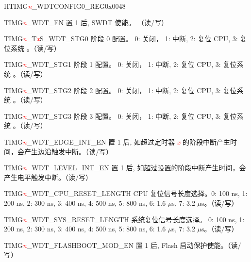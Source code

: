 \begin{register}{H}{TIMG\textcolor{red}{\it{n}}\_WDTCONFIG0\_REG}{0x0048}\label{regdesc:TIMERSWDTCONFIG0REG}
%
%
%
%
%
%
%
%
%
%
%
\regnewline%
\begin{regdesc}\begin{reglist}
\item [TIMG\textcolor{red}{\it{n}}\_WDT\_EN]置 1 后, SWDT 使能。 （读/写）
\item [TIMG\textcolor{red}{\it{n}}\_T\textcolor{red}{\it{x}}S\_WDT\_STG0]阶段 0 配置。 0: 关闭， 1: 中断, 2: 复位 CPU, 3: 复位系统 。（读/写）
\item [TIMG\textcolor{red}{\it{n}}\_WDT\_STG1]阶段 1 配置。 0: 关闭， 1: 中断, 2: 复位 CPU, 3: 复位系统 。（读/写）
\item [TIMG\textcolor{red}{\it{n}}\_WDT\_STG2]阶段 2 配置。 0: 关闭， 1: 中断, 2: 复位 CPU, 3: 复位系统 。（读/写）
\item [TIMG\textcolor{red}{\it{n}}\_WDT\_STG3]阶段 3 配置。 0: 关闭， 1: 中断, 2: 复位 CPU, 3: 复位系统 。（读/写）
\item [TIMG\textcolor{red}{\it{n}}\_WDT\_EDGE\_INT\_EN]置 1 后, 如超过定时器 \textcolor{red}{\it{x}} 的阶段中断产生时间，会产生边沿触发中断。（读/写）
\item [TIMG\textcolor{red}{\it{n}}\_WDT\_LEVEL\_INT\_EN]置 1 后, 如超过设置的阶段中断产生时间，会产生电平触发中断。（读/写）
\item [TIMG\textcolor{red}{\it{n}}\_WDT\_CPU\_RESET\_LENGTH]CPU 复位信号长度选择。0: 100 ns, 1: 200 ns, 2: 300 ns, 3: 400 ns, 4: 500 ns, 5: 800 ns, 6: 1.6 $\mu$s, 7: 3.2 $\mu$s。（读/写）
\item [TIMG\textcolor{red}{\it{n}}\_WDT\_SYS\_RESET\_LENGTH]系统复位信号长度选择。 0: 100 ns, 1: 200 ns, 2: 300 ns, 3: 400 ns, 4: 500 ns, 5: 800 ns, 6: 1.6 $\mu$s, 7: 3.2 $\mu$s。（读/写）
\item [TIMG\textcolor{red}{\it{n}}\_WDT\_FLASHBOOT\_MOD\_EN]置 1 后, Flash 启动保护使能。（读/写）
\end{reglist}\end{regdesc}
\end{register}


